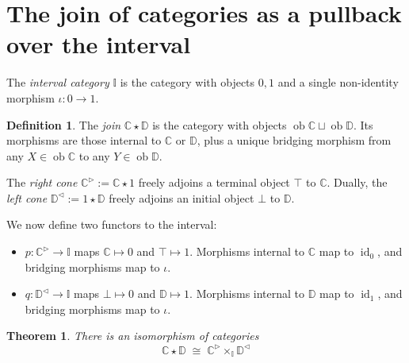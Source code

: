 \documentclass{article}
\newtheorem{theorem}[proposition]{Theorem}
\theoremstyle{definition}
\newtheorem{definition}[proposition]{Definition}
\newcommand{\C}{\mathbb{C}}
\newcommand{\D}{\mathbb{D}}
\newcommand{\I}{\mathbb{I}}
\DeclareMathOperator{\ob}{ob}
\DeclareMathOperator{\id}{id}
\begin{document}
\section{The join of categories as a pullback over the interval}

The \emph{interval category} $\I$ is the category with objects $0, 1$ and a single non-identity morphism $\iota : 0 \to 1$.

\begin{definition}\label{join}
	The \emph{join} $\C \star \D$ is the category with objects $\ob\C \sqcup \ob\D$. Its morphisms are those internal to $\C$ or $\D$, plus a unique bridging morphism from any $X \in \ob\C$ to any $Y \in \ob\D$.
\end{definition}

The \emph{right cone} $\C^\triangleright := \C \star 1$ freely adjoins a terminal object $\top$ to $\C$. Dually, the \emph{left cone} $\D^\triangleleft := 1 \star \D$ freely adjoins an initial object $\bot$ to $\D$.

We now define two functors to the interval:
\begin{itemize}
	\item $p : \C^\triangleright \to \I$ maps $\C \mapsto 0$ and $\top \mapsto 1$. Morphisms internal to $\C$ map to $\id_0$, and bridging morphisms map to $\iota$.
	\item $q : \D^\triangleleft \to \I$ maps $\bot \mapsto 0$ and $\D \mapsto 1$. Morphisms internal to $\D$ map to $\id_1$, and bridging morphisms map to $\iota$.
\end{itemize}

\begin{theorem}\label{main}
	There is an isomorphism of categories
	\[\C \star \D \;\cong\; \C^\triangleright \times_\I \D^\triangleleft\]
\end{theorem}
\end{document}
